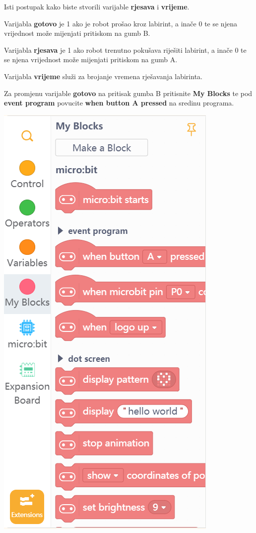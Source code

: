 \vspace{3mm}

Isti postupak kako biste stvorili varijable \textbf{rjesava} i \textbf{vrijeme}.

Varijabla \textbf{gotovo} je 1 ako je robot prošao kroz labirint, a inače 0 te se njena vrijednost može mijenjati pritiskom na gumb B.

Varijabla \textbf{rjesava} je 1 ako robot trenutno pokušava riješiti labirint, a inače 0 te se njena vrijednost može mijenjati pritiskom na gumb A.

Varijabla \textbf{vrijeme} služi za brojanje vremena rješavanja labirinta.

Za promjenu varijable \textbf{gotovo} na pritisak gumba B pritisnite \textbf{My Blocks} te pod \textbf{event program} povucite \textbf{when button A pressed} na sredinu programa.

\vspace{3mm}

\includegraphics[scale=0.75]{Rjesenje3.png}

